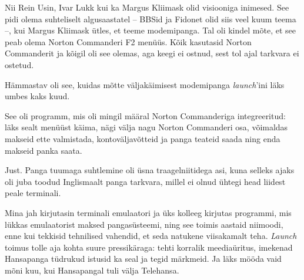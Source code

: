 Nii Rein Usin, Ivar Lukk kui ka Margus Kliimask olid 
visiooniga inimesed. See pidi olema suhteliselt algusaastatel -- BBSid ja 
Fidonet olid siis veel kuum teema --, kui Margus Kliimask ütles, et teeme 
modemipanga. Tal oli kindel mõte, et see peab olema Norton 
Commanderi F2 menüüs. Kõik kasutasid Norton Commanderit 
ja kõigil oli see olemas, aga keegi ei ostnud, sest tol ajal tarkvara ei ostetud. 


Hämmastav oli see, kuidas mõtte väljakäimisest 
modemipanga \emph{launch}'ini läks umbes kaks kuud.


See oli programm, mis oli mingil määral Norton Commanderiga integreeritud: 
läks sealt menüüst käima, nägi välja nagu Norton Commanderi 
osa, võimaldas makseid ette valmistada, kontoväljavõtteid ja panga teateid 
saada ning enda makseid panka saata.


Just. Panga tuumaga suhtlemine oli üsna traagelniitidega asi, kuna selleks 
ajaks oli juba toodud Inglismaalt panga tarkvara, millel ei olnud ühtegi head 
liidest peale terminali.


Mina jah kirjutasin terminali emulaatori ja üks kolleeg kirjutas programmi, mis 
lükkas emulaatorist maksed pangasüsteemi, ning see toimis 
aastaid niimoodi, enne kui tekkisid tehnilised vahendid, et seda 
natukene viisakamalt teha. \emph{Launch} toimus 
tolle aja kohta suure pressikäraga: tehti korralik meediaüritus, imekenad 
Hansapanga tüdrukud istusid ka seal ja tegid märkmeid. Ja läks mööda vaid
mõni kuu, kui Hansapangal tuli välja
Telehansa.

